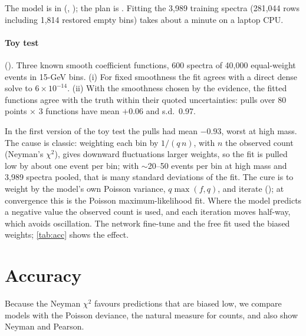 The model is in  (, ); the plan
is . Fitting the 3,989 training spectra (281,044 rows
including 1,814 restored empty bins) takes about a minute on a laptop CPU.

\paragraph{Toy test} (). Three known smooth coefficient functions,
600 spectra of 40,000 equal-weight events in 15-GeV bins. (i) For fixed smoothness the fit
agrees with a direct dense solve to $6\times10^{-14}$. (ii) With the smoothness chosen by the
evidence, the fitted functions agree with the truth within their quoted uncertainties: pulls
over 80 points $\times$ 3 functions have mean $+0.06$ and s.d.\ 0.97.

\begin{watch}
In the first version of the toy test the pulls had mean $-0.93$, worst at high mass. The
cause is classic: weighting each bin by $1/(q\,n)$, with $n$ the observed count (Neyman's
$\chi^2$), gives downward fluctuations larger weights, so the fit is pulled low by about one
event per bin; with $\sim$20--50 events per bin at high mass and 3,989 spectra pooled, that
is many standard deviations of the fit. The cure is to weight by the model's own Poisson
variance, $q\max(f, q)$, and iterate (); at convergence this is the Poisson
maximum-likelihood fit. Where the model predicts a negative value the observed count is used,
and each iteration moves half-way, which avoids oscillation. The network fine-tune and the
free fit used the biased weights; \cref{tab:acc} shows the effect.
\end{watch}

\section{Accuracy}

Because the Neyman $\chi^2$ favours predictions that are biased low, we compare models with
the Poisson deviance, the natural measure for counts, and also show Neyman and Pearson.

